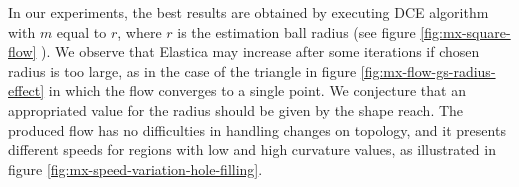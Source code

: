 \documentclass[smallextended]{svjour3}       %
\begin{document}
{In our experiments, the best results are obtained by executing DCE algorithm with $m$ equal to $r$, where $r$ is
  the estimation ball radius (see figure \ref{fig:mx-square-flow} ). We observe that Elastica may increase after some
  iterations if chosen radius is too large, as in the case of the triangle in figure \ref{fig:mx-flow-gs-radius-effect}
  in which the flow converges to a single point. We conjecture that an appropriated value for the radius should be given
  by the shape reach.  The produced flow has no difficulties in handling changes on topology, and it presents different
  speeds for regions with low and high curvature values, as illustrated in figure
  \ref{fig:mx-speed-variation-hole-filling}.

\begin{figure}[hp!]
\center				
		\setcounter{subfigure}{-3}
\end{figure}}
\end{document}
